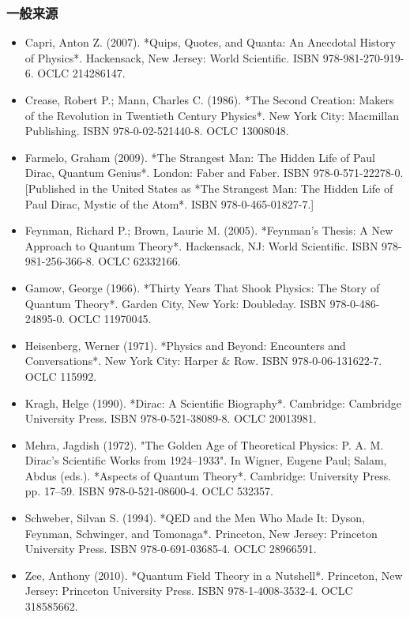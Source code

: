 \subsubsection{一般来源}
\begin{itemize}
\item Capri, Anton Z. (2007). *Quips, Quotes, and Quanta: An Anecdotal History of Physics*. Hackensack, New Jersey: World Scientific. ISBN 978-981-270-919-6. OCLC 214286147.
\item Crease, Robert P.; Mann, Charles C. (1986). *The Second Creation: Makers of the Revolution in Twentieth Century Physics*. New York City: Macmillan Publishing. ISBN 978-0-02-521440-8. OCLC 13008048.
\item Farmelo, Graham (2009). *The Strangest Man: The Hidden Life of Paul Dirac, Quantum Genius*. London: Faber and Faber. ISBN 978-0-571-22278-0. [Published in the United States as *The Strangest Man: The Hidden Life of Paul Dirac, Mystic of the Atom*. ISBN 978-0-465-01827-7.]
\item Feynman, Richard P.; Brown, Laurie M. (2005). *Feynman's Thesis: A New Approach to Quantum Theory*. Hackensack, NJ: World Scientific. ISBN 978-981-256-366-8. OCLC 62332166.
\item Gamow, George (1966). *Thirty Years That Shook Physics: The Story of Quantum Theory*. Garden City, New York: Doubleday. ISBN 978-0-486-24895-0. OCLC 11970045.
\item Heisenberg, Werner (1971). *Physics and Beyond: Encounters and Conversations*. New York City: Harper & Row. ISBN 978-0-06-131622-7. OCLC 115992.
\item Kragh, Helge (1990). *Dirac: A Scientific Biography*. Cambridge: Cambridge University Press. ISBN 978-0-521-38089-8. OCLC 20013981.
\item Mehra, Jagdish (1972). "The Golden Age of Theoretical Physics: P. A. M. Dirac's Scientific Works from 1924–1933". In Wigner, Eugene Paul; Salam, Abdus (eds.). *Aspects of Quantum Theory*. Cambridge: University Press. pp. 17–59. ISBN 978-0-521-08600-4. OCLC 532357.
\item Schweber, Silvan S. (1994). *QED and the Men Who Made It: Dyson, Feynman, Schwinger, and Tomonaga*. Princeton, New Jersey: Princeton University Press. ISBN 978-0-691-03685-4. OCLC 28966591.
\item Zee, Anthony (2010). *Quantum Field Theory in a Nutshell*. Princeton, New Jersey: Princeton University Press. ISBN 978-1-4008-3532-4. OCLC 318585662.
\end{itemize}
